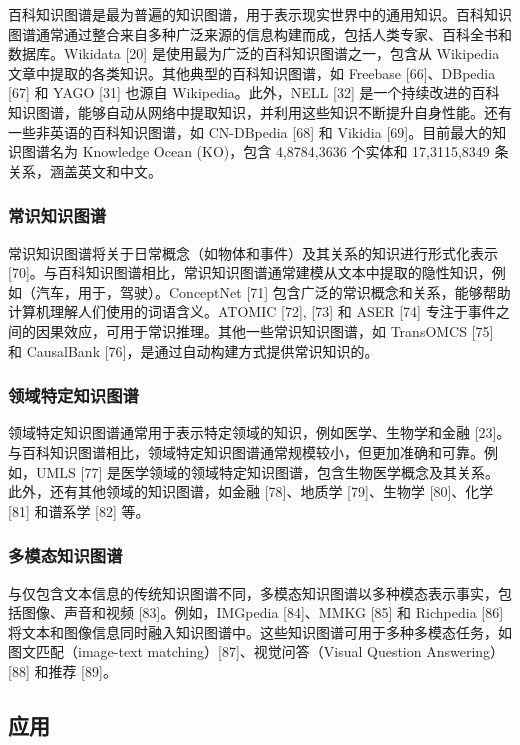 \documentclass[11pt,UTF8,fontset=fandol]{ctexart}
\begin{document}
百科知识图谱是最为普遍的知识图谱，用于表示现实世界中的通用知识。百科知识图谱通常通过整合来自多种广泛来源的信息构建而成，包括人类专家、百科全书和数据库。Wikidata [20] 是使用最为广泛的百科知识图谱之一，包含从 Wikipedia 文章中提取的各类知识。其他典型的百科知识图谱，如 Freebase [66]、DBpedia [67] 和 YAGO [31] 也源自 Wikipedia。此外，NELL [32] 是一个持续改进的百科知识图谱，能够自动从网络中提取知识，并利用这些知识不断提升自身性能。还有一些非英语的百科知识图谱，如 CN-DBpedia [68] 和 Vikidia [69]。目前最大的知识图谱名为 Knowledge Ocean (KO)，包含 4,8784,3636 个实体和 17,3115,8349 条关系，涵盖英文和中文。

\subsubsection{常识知识图谱}

常识知识图谱将关于日常概念（如物体和事件）及其关系的知识进行形式化表示 [70]。与百科知识图谱相比，常识知识图谱通常建模从文本中提取的隐性知识，例如（汽车，用于，驾驶）。ConceptNet [71] 包含广泛的常识概念和关系，能够帮助计算机理解人们使用的词语含义。ATOMIC [72], [73] 和 ASER [74] 专注于事件之间的因果效应，可用于常识推理。其他一些常识知识图谱，如 TransOMCS [75] 和 CausalBank [76]，是通过自动构建方式提供常识知识的。

\subsubsection{领域特定知识图谱}

领域特定知识图谱通常用于表示特定领域的知识，例如医学、生物学和金融 [23]。与百科知识图谱相比，领域特定知识图谱通常规模较小，但更加准确和可靠。例如，UMLS [77] 是医学领域的领域特定知识图谱，包含生物医学概念及其关系。此外，还有其他领域的知识图谱，如金融 [78]、地质学 [79]、生物学 [80]、化学 [81] 和谱系学 [82] 等。

\subsubsection{多模态知识图谱}

与仅包含文本信息的传统知识图谱不同，多模态知识图谱以多种模态表示事实，包括图像、声音和视频 [83]。例如，IMGpedia [84]、MMKG [85] 和 Richpedia [86] 将文本和图像信息同时融入知识图谱中。这些知识图谱可用于多种多模态任务，如图文匹配（image-text matching）[87]、视觉问答（Visual Question Answering）[88] 和推荐 [89]。

\subsection{应用}
\end{document}
